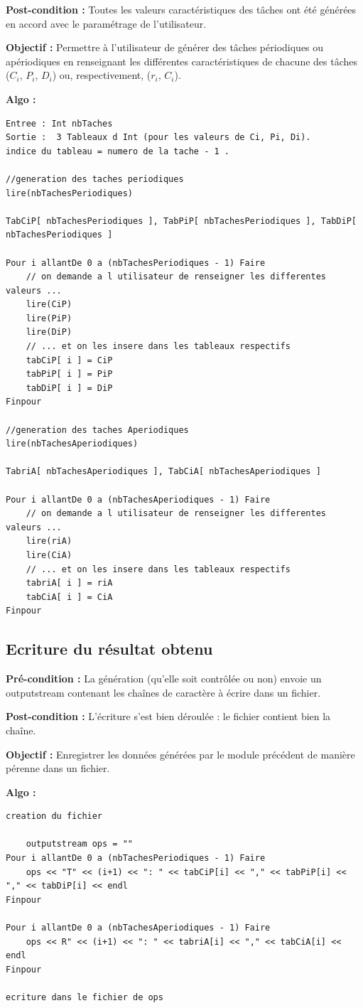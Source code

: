 			\textbf{Post-condition :} Toutes les valeurs caractéristiques des tâches ont été générées en accord avec le paramétrage de l’utilisateur.
		
			\textbf{Objectif :} Permettre à l’utilisateur de générer des tâches périodiques ou apériodiques en renseignant les différentes caractéristiques de chacune des tâches ($C_i$, $P_i$, $D_i$) ou, respectivement, ($r_i$, $C_i$).
		
			\textbf{Algo :} 
			\begin{lstlisting}
Entree : Int nbTaches
Sortie :  3 Tableaux d Int (pour les valeurs de Ci, Pi, Di). 
indice du tableau = numero de la tache - 1 .

//generation des taches periodiques
lire(nbTachesPeriodiques)

TabCiP[ nbTachesPeriodiques ], TabPiP[ nbTachesPeriodiques ], TabDiP[ nbTachesPeriodiques ]
		
Pour i allantDe 0 a (nbTachesPeriodiques - 1) Faire
	// on demande a l utilisateur de renseigner les differentes valeurs ...
	lire(CiP)
	lire(PiP)
	lire(DiP)        
	// ... et on les insere dans les tableaux respectifs
	tabCiP[ i ] = CiP
	tabPiP[ i ] = PiP
	tabDiP[ i ] = DiP
Finpour

//generation des taches Aperiodiques
lire(nbTachesAperiodiques)

TabriA[ nbTachesAperiodiques ], TabCiA[ nbTachesAperiodiques ]
		
Pour i allantDe 0 a (nbTachesAperiodiques - 1) Faire
	// on demande a l utilisateur de renseigner les differentes valeurs ...
	lire(riA)
	lire(CiA)        
	// ... et on les insere dans les tableaux respectifs
	tabriA[ i ] = riA
	tabCiA[ i ] = CiA
Finpour

			\end{lstlisting}

		\subsection{Ecriture du résultat obtenu}
			\textbf{Pré-condition :} La génération (qu'elle soit contrôlée ou non) envoie un outputstream contenant les chaînes de caractère à écrire dans un fichier.
		
			\textbf{Post-condition :} L'écriture s'est bien déroulée : le fichier contient bien la chaîne.
		
			\textbf{Objectif :} Enregistrer les données générées par le module précédent de manière pérenne dans un fichier.
		
			\textbf{Algo :}
			\begin{lstlisting}
creation du fichier

	outputstream ops = ""
Pour i allantDe 0 a (nbTachesPeriodiques - 1) Faire
	ops << "T" << (i+1) << ": " << tabCiP[i] << "," << tabPiP[i] << "," << tabDiP[i] << endl
Finpour

Pour i allantDe 0 a (nbTachesAperiodiques - 1) Faire
	ops << R" << (i+1) << ": " << tabriA[i] << "," << tabCiA[i] << endl
Finpour

ecriture dans le fichier de ops
  
		\end{lstlisting}
	

